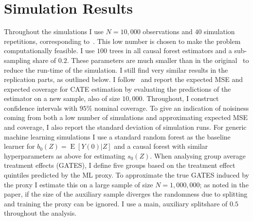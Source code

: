 \documentclass[11pt, a4paper, leqno]{article}
\DeclareMathOperator{\E}{E}
\begin{document}
\section{Simulation Results}
Throughout the simulations I use $N=10,000$ observations and $40$ simulation repetitions, corresponding to~\cite{wager2018estimation}.
This low number is chosen to make the problem computationally feasible.
I use $100$ trees in all causal forest estimators and a sub-sampling share of $0.2$.
These parameters are much smaller than in the original~\cite{wager2018estimation} to reduce the run-time of the simulation.
I still find very similar results in the replication parts, as outlined below.
I follow~\cite{wager2018estimation} and report the expected MSE and expected coverage for CATE estimation by evaluating the predictions of the estimator on a new sample, also of size $10,000$.
Throughout, I construct confidence intervals with $95\%$ nominal coverage.
To give an indication of noisiness coming from both a low number of simulations and approximating expected MSE and coverage, I also report the standard deviation of simulation runs.
For generic machine learning simulations I use a standard random forest as the baseline learner for $b_0(Z) = \E[Y(0)|Z]$ and a causal forest with similar hyperparameters as above for estimating $s_0(Z)$.
When analysing group average treatment effects (GATES), I define five groups based on the treatment effect quintiles predicted by the ML proxy.
To approximate the true GATES induced by the proxy I estimate this on a large sample of size $N=1,000,000$; as noted in the paper, if the size of the auxiliary sample diverges the randomness due to splitting and training the proxy can be ignored.
I use a main, auxiliary splitshare of $0.5$ throughout the analysis.
\end{document}
